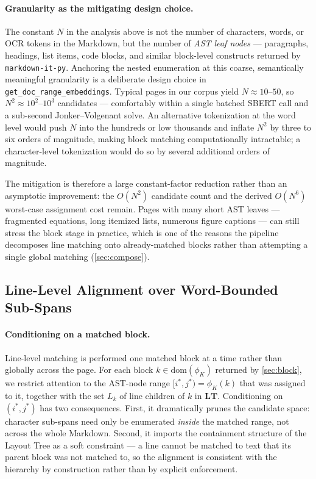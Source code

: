 \documentclass{article}
\theoremstyle{definition}
\newcommand{\LT}{\mathbf{LT}}
\begin{document}
\paragraph{Granularity as the mitigating design choice.}
The constant $N$ in the analysis above is not the number of
characters, words, or OCR tokens in the Markdown, but the number of
\emph{AST leaf nodes} --- paragraphs, headings, list items, code
blocks, and similar block-level constructs returned by
\texttt{markdown-it-py}.  Anchoring the nested enumeration at this
coarse, semantically meaningful granularity is a deliberate design
choice in \texttt{get\_doc\_range\_embeddings}.  Typical pages in our
corpus yield $N \approx 10$--$50$, so $N^2 \approx 10^2$--$10^3$
candidates --- comfortably within a single batched SBERT call and a
sub-second Jonker--Volgenant solve.  An alternative tokenization at
the word level would push $N$ into the hundreds or low thousands and
inflate $N^2$ by three to six orders of magnitude, making block
matching computationally intractable; a character-level tokenization
would do so by several additional orders of magnitude.

The mitigation is therefore a large constant-factor reduction rather
than an asymptotic improvement: the $O(N^2)$ candidate count and the
derived $O(N^6)$ worst-case assignment cost remain.  Pages with many
short AST leaves --- fragmented equations, long itemized lists,
numerous figure captions --- can still stress the block stage in
practice, which is one of the reasons the pipeline decomposes line
matching onto already-matched blocks rather than attempting a single
global matching (\cref{sec:compose}).

\subsection{Line-Level Alignment over Word-Bounded Sub-Spans}
\label{sec:line}

\paragraph{Conditioning on a matched block.}
Line-level matching is performed one matched block at a time rather
than globally across the page.  For each block
$k \in \mathrm{dom}(\phi_K)$ returned by \cref{sec:block}, we restrict
attention to the AST-node range $[i^{*}, j^{*}) = \phi_K(k)$ that was
assigned to it, together with the set $L_k$ of line children of $k$ in
$\LT$.  Conditioning on $(i^{*}, j^{*})$ has two consequences.
First, it dramatically prunes the candidate space: character sub-spans
need only be enumerated \emph{inside} the matched range, not across
the whole Markdown.  Second, it imports the containment structure of
the Layout Tree as a soft constraint --- a line cannot be matched to
text that its parent block was not matched to, so the alignment is
consistent with the hierarchy by construction rather than by explicit
enforcement.
\end{document}
